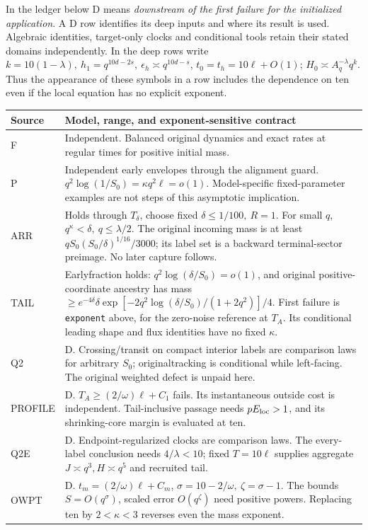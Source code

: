 \documentclass[11pt]{article}
\begin{document}
In the ledger below D means \emph{downstream of the first failure for
the initialized application}. A D row identifies its deep inputs and
where its result is used. Algebraic identities, target-only clocks and
conditional tools retain their stated domains independently. In the deep
rows write \(k=10(1-\lambda),\ h_1=q^{10d-2s},\
\epsilon_h\asymp q^{10d-s}\), \(t_0=t_h=10\ell+O(1)\);
\(H_0\asymp A_q^{-\lambda}q^k\).
Thus the appearance of these symbols in a row includes the dependence
on ten even if the local equation has no explicit exponent.
\small
\begin{longtable}{@{}p{}p{}@{}}
\toprule Source & Model, range, and exponent-sensitive contract\\\midrule\endhead
F & Independent. Balanced original dynamics and exact rates at regular times for positive initial mass.\\
P & Independent early envelopes through the alignment guard. \(q^2\log(1/S_0)=\kappa q^2\ell=o(1)\). Model-specific fixed-parameter examples are not steps of this asymptotic implication.\\
ARR & Holds through \(T_\delta\), choose fixed \(\delta\le1/100,\ R=1\). For small \(q\), \(q^\kappa<\delta,\ q\le\lambda/2\). The original incoming mass is at least \(qS_0(S_0/\delta)^{1/16}/3000\); its label set is a backward terminal-sector preimage. No later capture follows.\\
TAIL & Earlyfraction holds: \(q^2\log(\delta/S_0)=o(1)\), and original positive-coordinate ancestry has mass \(\ge e^{-4\delta}\delta\exp[-2q^2\log(\delta/S_0)/(1+2q^2)]/4\). First failure is \texttt{exponent} above, for the zero-noise reference at \(T_A\). Its conditional leading shape and flux identities have no fixed \(\kappa\).\\
Q2 & D. Crossing/transit on compact interior labels are comparison laws for arbitrary \(S_0\); originaltracking is conditional while left-facing. The original weighted defect is unpaid here.\\
PROFILE & D. \(T_A\ge(2/\omega)\ell+C_1\) fails. Its instantaneous outside cost is independent. Tail-inclusive passage needs \(pE_{\rm loc}>1\), and its shrinking-core margin is evaluated at ten.\\
Q2E & D. Endpoint-regularized clocks are comparison laws. The every-label conclusion needs \(4/\lambda<10\); fixed \(T=10\ell\) supplies aggregate \(J\asymp q^3,H\asymp q^5\) and recruited tail.\\
OWPT & D. \(t_m=(2/\omega)\ell+C_m\), \(\sigma=10-2/\omega,\ \zeta=\sigma-1\). The bounds \(S=O(q^\sigma)\), scaled error \(O(q^\zeta)\) need positive powers. Replacing ten by \(2<\kappa<3\) reverses even the mass exponent.\\

\end{longtable}
\end{document}
